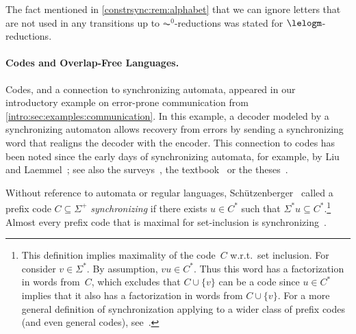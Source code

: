 The fact mentioned in \cref{constrsync:rem:alphabet}
that we can ignore letters that are not used in any transitions up to $\AC^0$-reductions
was stated \cite[Lem.~11]{FernauGHHVW19} for $\lelogm$-reductions.


\paragraph{Codes and Overlap-Free Languages.}
Codes, and a connection to synchronizing automata,
appeared in our introductory
example on error-prone communication from \cref{intro:sec:examples:communication}.
In this example, a decoder modeled by a synchronizing automaton
allows recovery from errors by sending a synchronizing word
that realigns the decoder with the encoder.
This connection to codes has been noted since the early days
of synchronizing automata,
for example, by Liu~\cite{Liu63} and Laemmel~\cite{Laemmel56,Laemmel63,Laemmel69};
see also the surveys~\cite{KariVolkov2021,Volkov22},
the textbook~\cite{DBLP:books/daglib/0025093} 
or the theses~\cite{Biskup2008,DBLP:phd/hal/Ryzhikov20}.

Without reference to automata or regular languages,
Schützenberger~\cite{DBLP:journals/iandc/Schutzenberger67} called a prefix code $C \subseteq \Sigma^+$
\emph{synchronizing} if there exists $u \in C^*$
such that $\Sigma^* u \subseteq C^*$.\footnote{This definition implies 
	maximality of the code~$C$ w.r.t.~set inclusion.
	For consider $v \in \Sigma^*$.
	By assumption, $vu \in C^*$.
	Thus this word has a factorization
	in words from~$C$, which excludes
	that $C \cup \{v\}$ can be a code
	since $u \in C^*$ implies that it also 
	has a factorization in words from $C \cup \{v\}$.
	For a more general definition of synchronization applying to a wider class of prefix codes (and even general codes), see~\cite{DBLP:books/daglib/0025093}.}
Almost every prefix code that is maximal for set-inclusion
is synchronizing~\cite{DBLP:journals/tit/FreilingJTZ03}. 

